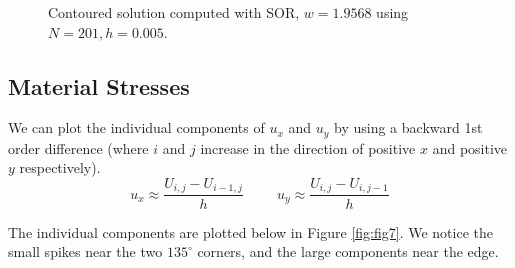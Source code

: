 \documentclass{article}
\numberwithin{equation}{section}
\theoremstyle{definition}
\begin{document}
\begin{figure}[H]
    \centering
    \hfill
    \caption{Contoured solution computed with SOR, $w=1.9568$ using $N=201, h=0.005$.}
    \label{fig:fig4}
\end{figure}

\subsection{Material Stresses}
We can plot the individual components of $u_x$ and $u_y$ by using a backward 1st order difference (where $i$ and $j$ increase in the direction of positive $x$ and positive $y$ respectively).
\begin{equation}
    u_x \approx \frac{U_{i,j} - U_{i-1,j}}{h} \hspace{1cm} u_y \approx \frac{U_{i,j} - U_{i,j-1}}{h}
\end{equation}

The individual components are plotted below in Figure \ref{fig:fig7}. We notice the small spikes near the two $135^{\circ} $ corners, and the large components near the edge.
\end{document}
